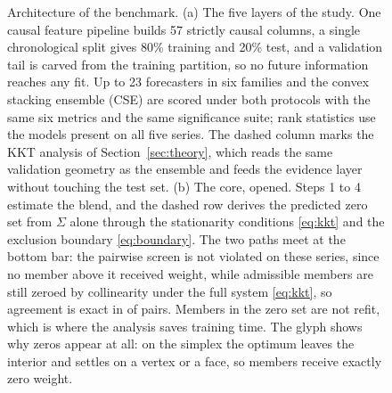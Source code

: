 \begin{figure}[!t]
{}
\caption{Architecture of the benchmark. (a) The five layers of the study. One causal feature pipeline builds 57 strictly causal columns, a single chronological split gives 80\% training and 20\% test, and a validation tail is carved from the training partition, so no future information reaches any fit. Up to 23 forecasters in six families and the convex stacking ensemble (CSE) are scored under both protocols with the same six metrics and the same significance suite; rank statistics use the \nCommonOne{} models present on all five series. The dashed column marks the KKT analysis of Section~\ref{sec:theory}, which reads the same validation geometry as the ensemble and feeds the evidence layer without touching the test set. (b) The core, opened. Steps 1 to 4 estimate the blend, and the dashed row derives the predicted zero set from $\Sigma$ alone through the stationarity conditions \eqref{eq:kkt} and the exclusion boundary \eqref{eq:boundary}. The two paths meet at the bottom bar: the pairwise screen is not violated on these series, since no member above it received weight, while \nAdmZero{} admissible members are still zeroed by collinearity under the full system \eqref{eq:kkt}, so agreement is exact in \nAgree{} of \nNonLeading{} pairs. Members in the zero set are not refit, which is where the analysis saves training time. The glyph shows why zeros appear at all: on the simplex the optimum leaves the interior and settles on a vertex or a face, so members receive exactly zero weight.}
\label{fig:arch}
\end{figure}
